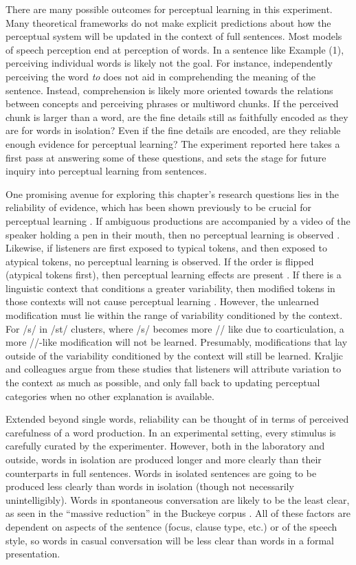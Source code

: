 There are many possible outcomes for perceptual learning in this experiment.
Many theoretical frameworks do not make explicit predictions about how the perceptual system will be updated in the context of full sentences.
Most models of speech perception end at perception of words.
In a sentence like Example (1), perceiving individual words is likely not the goal.
For instance, independently perceiving the word \emph{to} does not aid in comprehending the meaning of the sentence.
Instead, comprehension is likely more oriented towards the relations between concepts and perceiving phrases or multiword chunks.
If the perceived chunk is larger than a word, are the fine details still as faithfully encoded as they are for words in isolation?
Even if the fine details are encoded, are they reliable enough evidence for perceptual learning?
The experiment reported here takes a first pass at answering some of these questions, and sets the stage for future inquiry into perceptual learning from sentences. 

One promising avenue for exploring this chapter's research questions lies in the reliability of evidence, which has been shown previously to be crucial for perceptual learning \citep{Kraljic2008, Kraljic2008a}.
If ambiguous productions are accompanied by a video of the speaker holding a pen in their mouth, then no perceptual learning is observed \citep{Kraljic2008}.
Likewise, if listeners are first exposed to typical tokens, and then exposed to atypical tokens, no perceptual learning is observed.
If the order is flipped (atypical tokens first), then perceptual learning effects are present \citep{Kraljic2008}.
If there is a linguistic context that conditions a greater variability, then modified tokens in those contexts will not cause perceptual learning \citep{Kraljic2008a}.
However, the unlearned modification must lie within the range of variability conditioned by the context.
For /s/ in /st\textturnr/ clusters, where /s/ becomes more /\textesh/ like due to coarticulation, a more /\textesh/-like modification will not be learned.
Presumably, modifications that lay outside of the variability conditioned by the context will still be learned.
Kraljic and colleagues argue from these studies that listeners will attribute variation to the context as much as possible, and only fall back to updating perceptual categories when no other explanation is available.

Extended beyond single words, reliability can be thought of in terms of perceived carefulness of a word production.
In an experimental setting, every stimulus is carefully curated by the experimenter.
However, both in the laboratory and outside, words in isolation are produced longer and more clearly than their counterparts in full sentences.
Words in isolated sentences are going to be produced less clearly than words in isolation (though not necessarily unintelligibly).
Words in spontaneous conversation are likely to be the least clear, as seen in the ``massive reduction'' in the Buckeye corpus \citep{Johnson2004, Dilts2013}.
All of these factors are dependent on aspects of the sentence (focus, clause type, etc.) or of the speech style, so words in casual conversation will be less clear than words in a formal presentation.

